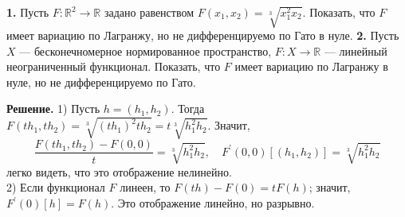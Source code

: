 \begin{task}
    \textbf{1.} Пусть $F: \mathbb{R}^2 \rightarrow \mathbb{R}$ задано равенством $F\left(x_1, x_2\right)=\sqrt[3]{x_1^2 x_2}$. 
    Показать, что $F$ имеет вариацию по Лагранжу, но не дифференцируемо по Гато в нуле. 
    \textbf{2.} Пусть $X$ --- бесконечномерное нормированное пространство, $F: X \rightarrow \mathbb{R}$ 
    --- линейный неограниченный функционал. Показать, что $F$ имеет вариацию по Лагранжу в нуле, 
    но не дифференцируемо по Гато.
    
    \textbf{Решение.} 1) Пусть $h = \left( h_1, h_2 \right)$. 
    Тогда $F\left(t h_1, t h_2\right)=\sqrt[3]{\left(t h_1\right)^{2} t h_2}=t \sqrt[3]{h_1^2 h_2}$. Значит,
    \[ 
    \frac{F\left(t h_1, t h_2\right)-F(0,0)}{t}=\sqrt[3]{h_1^2 h_2}, \quad F^{\prime}(0,0)\left[\left(h_1, h_2\right)\right]=\sqrt[3]{h_1^2 h_2}
    \]  
    легко видеть, что это отображение нелинейно.\\
    2) Если функционал $F$ линеен, то $F(t h)-F(0)=t F(h)$; значит, $F^{\prime}(0)[h]=F(h)$. Это отображение линейно, но разрывно.
    
    \end{task}